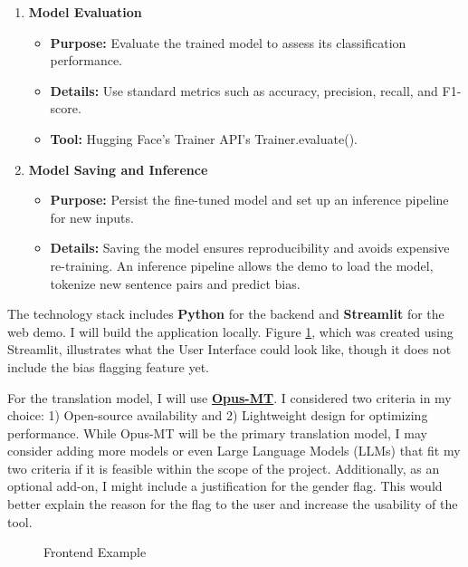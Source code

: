 \documentclass[oneside, paper=A4, DIV=15]{scrartcl}
\begin{document}
\begin{description}
\begin{enumerate}
    \item \textbf{Model Evaluation}
    \begin{itemize}
        \item \textbf{Purpose:} Evaluate the trained model to assess its classification performance.
        \item \textbf{Details:} Use standard metrics such as accuracy, precision, recall, and F1-score.
        \item \textbf{Tool:} Hugging Face's Trainer API's Trainer.evaluate().
    \end{itemize}
    
    \item \textbf{Model Saving and Inference}
    \begin{itemize}
        \item \textbf{Purpose:} Persist the fine-tuned model and set up an inference pipeline for new inputs.
        \item \textbf{Details:}  
        Saving the model ensures reproducibility and avoids expensive re-training.  
        An inference pipeline allows the demo to load the model, tokenize new sentence pairs and predict bias.
    \end{itemize}
\end{enumerate}


The technology stack includes \textbf{Python} for the backend and \textbf{Streamlit} for the web demo. I will build the application locally. Figure \ref{fig:demo_image}, which was created using Streamlit, illustrates what the User Interface could look like, though it does not include the bias flagging feature yet.


For the translation model, I will use \textbf{\href{https://github.com/Helsinki-NLP/Opus-MT?tab=readme-ov-file}{Opus-MT}}. I considered two criteria in my choice: 1) Open-source availability and 2) Lightweight design for optimizing performance. While Opus-MT will be the primary translation model, I may consider adding more models or even Large Language Models (LLMs) that fit my two criteria if it is feasible within the scope of the project. Additionally, as an optional add-on, I might include a justification for the gender flag. This would better explain the reason for the flag to the user and increase the usability of the tool.

\begin{figure}[htbp]
    \centering
    \caption{Frontend Example}
    \label{fig:demo_image}
\end{figure}


\end{description}
\end{document}
